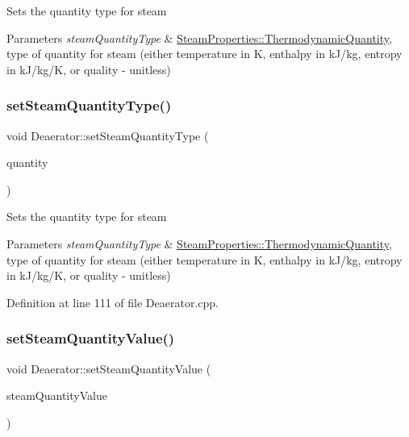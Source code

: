 Sets the quantity type for steam 
\begin{DoxyParams}{Parameters}
{\em steam\+Quantity\+Type} & \hyperlink{class_steam_properties_ae0294bedf7d178c2d8fb6aed0f62fbff}{Steam\+Properties\+::\+Thermodynamic\+Quantity}, type of quantity for steam (either temperature in K, enthalpy in k\+J/kg, entropy in k\+J/kg/K, or quality -\/ unitless) \\
\hline
\end{DoxyParams}
\mbox{\label{class_deaerator_a1aa3b3de064d148479af9576e717b6c2}} 
\subsubsection{\texorpdfstring{set\+Steam\+Quantity\+Type()}{setSteamQuantityType()}\hspace{0.1cm}{\footnotesize\ttfamily [3/3]}}
{\footnotesize\ttfamily void Deaerator\+::set\+Steam\+Quantity\+Type (\begin{DoxyParamCaption}\item[{\hyperlink{class_steam_properties_ae0294bedf7d178c2d8fb6aed0f62fbff}{Steam\+Properties\+::\+Thermodynamic\+Quantity}}]{quantity }\end{DoxyParamCaption})}

Sets the quantity type for steam 
\begin{DoxyParams}{Parameters}
{\em steam\+Quantity\+Type} & \hyperlink{class_steam_properties_ae0294bedf7d178c2d8fb6aed0f62fbff}{Steam\+Properties\+::\+Thermodynamic\+Quantity}, type of quantity for steam (either temperature in K, enthalpy in k\+J/kg, entropy in k\+J/kg/K, or quality -\/ unitless) \\
\hline
\end{DoxyParams}


Definition at line 111 of file Deaerator.\+cpp.

\mbox{\label{class_deaerator_a101399a8b66c3ff1fecf884fd1b1373d}} 
\subsubsection{\texorpdfstring{set\+Steam\+Quantity\+Value()}{setSteamQuantityValue()}\hspace{0.1cm}{\footnotesize\ttfamily [1/3]}}
{\footnotesize\ttfamily void Deaerator\+::set\+Steam\+Quantity\+Value (\begin{DoxyParamCaption}\item[{double}]{steam\+Quantity\+Value }\end{DoxyParamCaption})}

